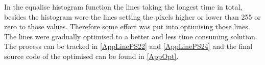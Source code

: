 In the equalise histogram function the lines taking the longest time in total, besides the histogram were the lines setting the pixels higher or lower than 255 or zero to those values. Therefore some effort was put into optimising those lines. The lines were gradually optimised to a better and less time consuming solution. The process can be tracked in \autoref{AppLinePS22} and \autoref{AppLinePS24} and the final source code of the optimised can be found in \autoref{AppOpt}.